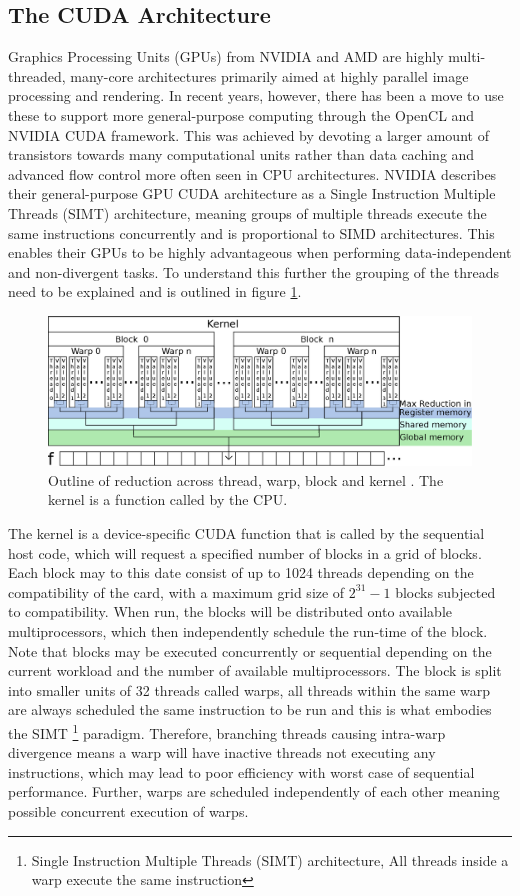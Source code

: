 \documentclass{llncs}
\begin{document}
\subsection{The CUDA Architecture} \label{Cuda} %
Graphics Processing Units (GPUs) from NVIDIA and AMD are highly multi-threaded, many-core architectures primarily aimed at highly parallel image processing and rendering. In recent years, however, there has been a move to use these to support more general-purpose computing through the OpenCL and NVIDIA CUDA framework. This was achieved by devoting a larger amount of transistors towards many computational units rather than data caching and advanced  flow control more often seen in CPU architectures. NVIDIA describes their general-purpose GPU CUDA architecture as a Single Instruction Multiple Threads (SIMT) architecture, meaning groups of multiple threads execute the same instructions concurrently and is proportional to SIMD architectures. 
This enables their GPUs to be highly advantageous when performing data-independent and non-divergent tasks. To understand this further the grouping of the threads need to be explained and is outlined in figure \ref{fig:reduction}.
\begin{figure}
\centering
\includegraphics[width=\linewidth]{reduction}
\caption{Outline of reduction across thread, warp, block and kernel \label{fig:reduction}. The kernel is a function called by the CPU.}
\end{figure}
The kernel is a device-specific CUDA function that is called by the sequential host code, which will request a specified number of blocks in a grid of blocks. Each block may to this date consist of up to 1024 threads depending on the compatibility of the card, with a maximum grid size of $2^{31}-1$ blocks subjected to compatibility. When run, the blocks will be distributed onto available multiprocessors, which then independently schedule the run-time of the block. Note that blocks may be executed concurrently or sequential depending on the current workload and the number of available multiprocessors. The block is split into smaller units of 32 threads called warps, all threads within the same warp are always scheduled the same instruction to be run and this is what embodies the SIMT \footnote{Single Instruction Multiple Threads (SIMT) architecture, All threads inside a warp execute the same instruction} paradigm.  Therefore, branching threads causing intra-warp divergence means a warp will have inactive threads not executing any instructions,  which may lead to poor efficiency with worst case of sequential performance. Further, warps are scheduled independently of each other meaning possible concurrent execution of warps.
\end{document}
